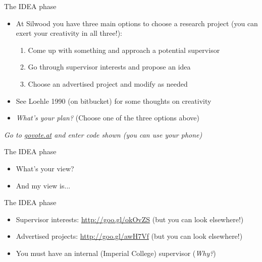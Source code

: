 \documentclass[xcolor=x11names,compress]{beamer}
\renewcommand{\(}{\begin{columns}}
\renewcommand{\)}{\end{columns}}
\newcommand{\<}[1]{\begin{column}{#1}}
\renewcommand{\>}{\end{column}}
\begin{document}
\begin{frame}{The IDEA phase}

  \begin{itemize}[<+->]\itemsep12pt
		\item At Silwood you have three main options to choose a research 
		project (you can exert your creativity in all three!):
    \vspace{6pt}
    \begin{enumerate} \setlength{\itemindent}{-1em}\itemsep6pt
        \small
        \item Come up with something and approach a potential supervisor
        \item Go through supervisor interests and propose an idea 
        \item Choose an advertised project and modify as needed
    \end{enumerate}
    \item See Loehle 1990 (on bitbucket) for some thoughts on creativity
    \item {\it What's your plan?} (Choose one of the three options above)
 \end{itemize}

\vspace*{16pt}

\pause
\centering 

{\it Go to \url{govote.at} and enter code shown (you can use your phone)}

\end{frame}

\begin{frame}{The IDEA phase}

  \begin{itemize}[<+->]\itemsep20pt
    \item What's your view?
    \item And my view is...
 \end{itemize}

\end{frame}

\begin{frame}{The IDEA phase}

  \begin{itemize}\itemsep20pt
    \item Supervisor interests: \url{http://goo.gl/okOvZS} (but you can look elsewhere!)
    \item Advertised projects: \url{http://goo.gl/awH7Vf} (but you can look elsewhere!) 
    \item You must have an internal (Imperial College) supervisor ({\it Why?}) 
 \end{itemize}

\end{frame}
\end{document}
